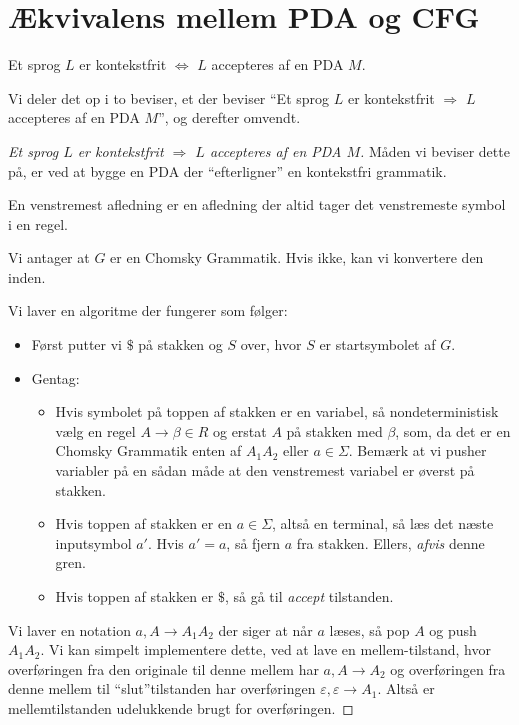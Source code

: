 \section{Ækvivalens mellem PDA og CFG}%
\label{sec:label}

\begin{theorem}
	Et sprog $L$ er kontekstfrit $\iff$ $L$ accepteres af en PDA $M$.
\end{theorem}
Vi deler det op i to beviser, et der beviser ``Et sprog $L$ er kontekstfrit \(\Rightarrow\) $L$ accepteres af en PDA $M$'', og derefter omvendt.

\begin{proof}[Et sprog $L$ er kontekstfrit \(\Rightarrow\) $L$ accepteres af en PDA $M$]
	Måden vi beviser dette på, er ved at bygge en PDA der ``efterligner'' en kontekstfri grammatik.
	\begin{definition}
		En venstremest afledning er en afledning der altid tager det venstremeste symbol i en regel.
	\end{definition}
	Vi antager at $G$ er en Chomsky Grammatik. Hvis ikke, kan vi konvertere den inden.

	Vi laver en algoritme der fungerer som følger:
	\begin{itemize}
		\item Først putter vi $\mathdollar$ på stakken og $S$ over, hvor $S$ er startsymbolet af $G$.
		\item Gentag:
		      \begin{itemize}
			      \item Hvis symbolet på toppen af stakken er en variabel, så nondeterministisk vælg en regel $A \rightarrow \beta \in R$ og erstat $A$ på stakken med $\beta$, som, da det er en Chomsky Grammatik enten af $A_{1}A_{2}$ eller $a \in \Sigma$. Bemærk at vi pusher variabler på en sådan måde at den venstremest variabel er øverst på stakken.
			      \item Hvis toppen af stakken er en $a \in \Sigma$, altså en terminal, så læs det næste inputsymbol $a'$. Hvis $a' = a$, så fjern $a$ fra stakken. Ellers, \textit{afvis} denne gren.
			      \item Hvis toppen af stakken er $\mathdollar$, så gå til \textit{accept} tilstanden.
		      \end{itemize}
	\end{itemize}

	Vi laver en notation $a, A \rightarrow A_{1}A_{2}$ der siger at når $a$ læses, så pop $A$ og push $A_{1}A_{2}$. Vi kan simpelt implementere dette, ved at lave en mellem-tilstand, hvor overføringen fra den originale til denne mellem har $a, A \rightarrow A_{2}$ og overføringen fra denne mellem til ``slut''tilstanden har overføringen $\varepsilon, \varepsilon \rightarrow A_{1}$. Altså er mellemtilstanden udelukkende brugt for overføringen.


\end{proof}

